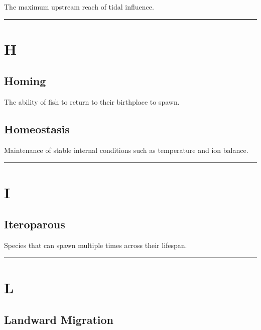 \documentclass[
]{book}
\begin{document}
The maximum upstream reach of tidal influence.

\begin{center}\rule{0.5\linewidth}{0.5pt}\end{center}

\section*{H}\label{h}

\subsection{\texorpdfstring{\textbf{Homing}}{Homing}}\label{homing}

The ability of fish to return to their birthplace to spawn.

\subsection{\texorpdfstring{\textbf{Homeostasis}}{Homeostasis}}\label{homeostasis}

Maintenance of stable internal conditions such as temperature and ion balance.

\begin{center}\rule{0.5\linewidth}{0.5pt}\end{center}

\section*{I}\label{i}

\subsection{\texorpdfstring{\textbf{Iteroparous}}{Iteroparous}}\label{iteroparous}

Species that can spawn multiple times across their lifespan.

\begin{center}\rule{0.5\linewidth}{0.5pt}\end{center}

\section*{L}\label{l}

\subsection{\texorpdfstring{\textbf{Landward Migration}}{Landward Migration}}\label{landward-migration-1}
\end{document}
